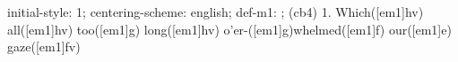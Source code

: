 initial-style: 1;
centering-scheme: english;
def-m1: \grealign;
(cb4) 1. Which([em1]hv) all([em1]hv) too([em1]g) long([em1]hv) o'er-([em1]g)whelmed([em1]f) our([em1]e) gaze([em1]fv)